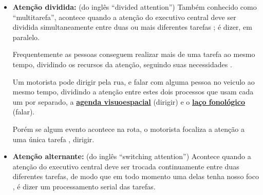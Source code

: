 \begin{itemize}
\item \textbf{Atenção dividida:} (do inglês ``divided attention'') 
Também conhecido como ``multitarefa'', acontece quando a atenção do executivo central deve ser dividida simultaneamente 
entre duas ou mais diferentes tarefas 
\cite[pp. 282]{braisby2012cognitive} \cite[pp. 155, 716]{eysenck2017manual} \cite[pp. 127]{eysenck2017manual};
é dizer, em paralelo.

Frequentemente as pessoas conseguem realizar mais de uma tarefa ao mesmo tempo,
dividindo os recursos da atenção, seguindo suas necessidades
\cite[pp. 124]{sternbergpsicologia}.

\begin{example}
\label{ex:motoristadividido}
Um motorista pode dirigir pela rua, e falar com alguma pessoa no veiculo ao mesmo tempo,
dividindo a atenção entre estes dois processos que usam cada um por separado,
a \hyperref[reflabel:visuoespacial]{\textbf{agenda  visuoespacial}} (dirigir)
e o \hyperref[reflabel:fonologico]{\textbf{laço fonológico}} (falar).

Porém se algum evento acontece na rota, o motorista focaliza a atenção a uma única tarefa ,
dirigir.
\end{example}

\item \textbf{Atenção alternante:} (do inglês ``switching attention'')
Acontece quando a atenção do executivo central deve ser trocada continuamente 
entre duas diferentes tarefas, de modo que em todo momento uma delas tenha nosso foco 
\cite[pp. 282]{braisby2012cognitive} \cite[pp. 127]{eysenck2017manual}, 
é dizer um processamento serial das tarefas.
\end{itemize}



